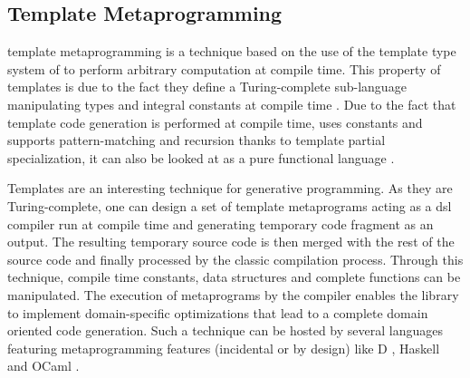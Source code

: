 \documentclass[../main]{subfiles}
\begin{document}
%
%
%


\subsection{
  Template Metaprogramming
}

\cpp template metaprogramming \cite{abrahams:2004} is a technique based on the
use of the template type system of \cpp to perform arbitrary computation at
compile time. This property of \cpp templates is due to the fact they
define a Turing-complete sub-language manipulating types and integral constants
at compile time \cite{unruh:1994}. Due to the fact that template code generation
is performed at compile time, uses constants and supports pattern-matching and
recursion thanks to template partial specialization, it can also be looked
at as a pure functional language \cite{haeri:2012}.

Templates are an interesting technique for generative programming. As they
are Turing-complete, one can design a set of template metaprograms acting as a
\gls{dsl} compiler run at compile time and generating temporary \cpp code
fragment as an output. The resulting temporary source code is then merged with
the rest of the source code and finally processed by the classic
compilation process. Through this technique, compile time constants,
data structures and complete functions can be manipulated.
The execution of metaprograms by the compiler enables the library to implement
domain-specific optimizations that lead to a complete domain oriented
code generation. Such a technique can be hosted by several languages featuring
metaprogramming features (incidental or by design) like D \cite{template:dlang},
Haskell \cite{sheard:2002} and OCaml \cite{serot:2008}.
\end{document}
